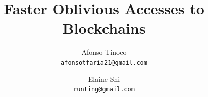 \documentclass[11pt,letterpaper]{article}
\newcommand{\elaine}[1]{{\footnotesize\color{magenta}[Elaine: #1]}}
\newcommand{\elaine}[1]{}
\theoremstyle{definition}
\newcommand{\proposalAuthor}[2]{%
  \parbox[t]{0.36\textwidth}{\centering #1\\[0.3ex]{\small\texttt{#2}}\par}%
}
\begin{document}
%
\title{Faster Oblivious Accesses to Blockchains} 
\renewcommand{\Authand}{\hspace{1.2em}}
\author{\protect\proposalAuthor{Afonso Tinoco}{afonsotfaria21@gmail.com}}
\author{\protect\proposalAuthor{Elaine Shi}{runting@gmail.com}}

\date{}

\maketitle
\thispagestyle{empty}






%
%


%
%






\end{document}
